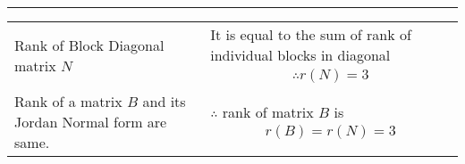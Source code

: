 \documentclass[journal,12pt,twocolumn]{IEEEtran}
\begin{document}
{\begin{center}
\begin{tabular}{ | m{3cm} | m{15cm}| }
{\begin{align*}
\end{align*}}\\ \hline
Rank of Block Diagonal matrix $N$ & It is equal to the sum of rank of individual blocks in diagonal{\begin{align*}
\therefore r(N) = 3
\end{align*}}\\ \hline
Rank of a matrix $B$ and its Jordan Normal form  are same. & $\therefore$ rank of matrix $B$ is {\begin{align*}r(B) = r(N) =3
\end{align*}}\\ \hline 
\end{tabular}
\end{center}
}
\end{document}
